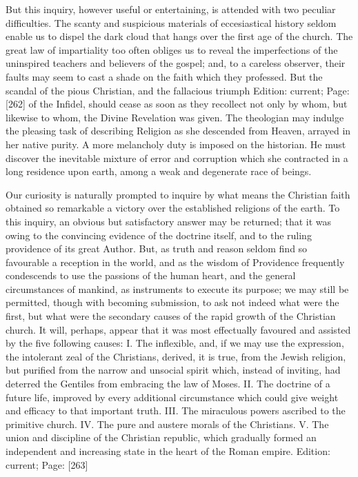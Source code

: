 But this inquiry, however useful or entertaining, is attended with two peculiar difficulties. The scanty and suspicious materials of eccesiastical history seldom enable us to dispel the dark cloud that hangs over the first age of the church. The great law of impartiality too often obliges us to reveal the imperfections of the uninspired teachers and believers of the gospel; and, to a careless observer, their faults may seem to cast a shade on the faith which they professed. But the scandal of the pious Christian, and the fallacious triumph Edition: current; Page: [262] of the Infidel, should cease as soon as they recollect not only by whom, but likewise to whom, the Divine Revelation was given. The theologian may indulge the pleasing task of describing Religion as she descended from Heaven, arrayed in her native purity. A more melancholy duty is imposed on the historian. He must discover the inevitable mixture of error and corruption which she contracted in a long residence upon earth, among a weak and degenerate race of beings.

Our curiosity is naturally prompted to inquire by what means the Christian faith obtained so remarkable a victory over the established religions of the earth. To this inquiry, an obvious but satisfactory answer may be returned; that it was owing to the convincing evidence of the doctrine itself, and to the ruling providence of its great Author. But, as truth and reason seldom find so favourable a reception in the world, and as the wisdom of Providence frequently condescends to use the passions of the human heart, and the general circumstances of mankind, as instruments to execute its purpose; we may still be permitted, though with becoming submission, to ask not indeed what were the first, but what were the secondary causes of the rapid growth of the Christian church. It will, perhaps, appear that it was most effectually favoured and assisted by the five following causes: I. The inflexible, and, if we may use the expression, the intolerant zeal of the Christians, derived, it is true, from the Jewish religion, but purified from the narrow and unsocial spirit which, instead of inviting, had deterred the Gentiles from embracing the law of Moses. II. The doctrine of a future life, improved by every additional circumstance which could give weight and efficacy to that important truth. III. The miraculous powers ascribed to the primitive church. IV. The pure and austere morals of the Christians. V. The union and discipline of the Christian republic, which gradually formed an independent and increasing state in the heart of the Roman empire.
Edition: current; Page: [263]

